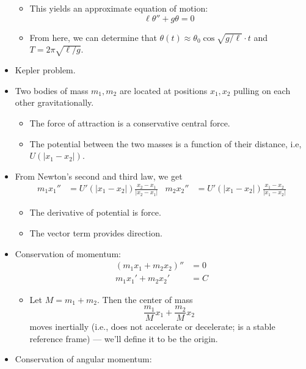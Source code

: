 \documentclass[../notes.tex]{subfiles}
\begin{document}
\begin{itemize}
    \begin{itemize}
        \item This yields an approximate equation of motion:
        \begin{equation*}
            \ell\theta''+g\theta = 0
        \end{equation*}
        \item From here, we can determine that $\theta(t)\approx\theta_0\cos\sqrt{g/\ell}\cdot t$ and $T=2\pi\sqrt{\ell/g}$.
    \end{itemize}
    \item Kepler problem.
    \item Two bodies of mass $m_1,m_2$ are located at positions $x_1,x_2$ pulling on each other gravitationally.
    \begin{itemize}
        \item The force of attraction is a conservative central force.
        \item The potential between the two masses is a function of their distance, i.e, $U(|x_1-x_2|)$.
    \end{itemize}
    \item From Newton's second and third law, we get
    \begin{align*}
        m_1x_1'' &= U'(|x_1-x_2|)\frac{x_2-x_1}{|x_2-x_1|}&
        m_2x_2'' &= U'(|x_1-x_2|)\frac{x_1-x_2}{|x_1-x_2|}
    \end{align*}
    \begin{itemize}
        \item The derivative of potential is force.
        \item The vector term provides direction.
    \end{itemize}
    \item Conservation of momentum:
    \begin{align*}
        (m_1x_1+m_2x_2)'' &= 0\\
        m_1x_1'+m_2x_2' &= C
    \end{align*}
    \begin{itemize}
        \item Let $M=m_1+m_2$. Then the center of mass
        \begin{equation*}
            \frac{m_1}{M}x_1+\frac{m_2}{M}x_2
        \end{equation*}
        moves inertially (i.e., does not accelerate or decelerate; is a stable reference frame) --- we'll define it to be the origin.
    \end{itemize}
    \item Conservation of angular momentum:

\end{itemize}
\end{document}
